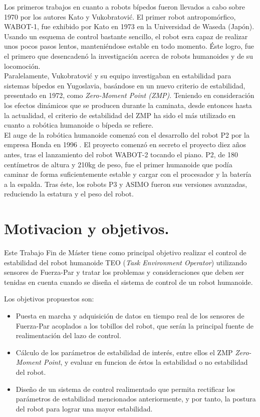 Los primeros trabajos en cuanto a robots bípedos fueron llevados a cabo sobre 1970 por los autores Kato \cite{Kaj} y Vukobratović. El primer robot antropomórfico, WABOT-1, fue exhibido por Kato en 1973 en la Universidad de Waseda (Japón). Usando un esquema de control bastante sencillo, el robot esra capaz de realizar unos pocos pasos lentos, manteniéndose estable en todo momento. Éste logro, fue el primero que desencadenó la investigación acerca de robots humanoides y de su locomoción.\\

Paralelamente, Vukobratović y su equipo investigaban en estabilidad para sistemas bípedos en Yugoslavia, basándose en un nuevo criterio de estabilidad, presentado en 1972, como \textit{Zero-Moment Point (ZMP)}. Teniendo en consideración los efectos dinámicos que se producen durante la caminata, desde entonces hasta la actualidad, el criterio de estabilidad del ZMP ha sido el más utilizado en cuanto a robótica humanoide o bípeda se refiere.\\

El auge de la robótica humanoide comenzó con el desarrollo del robot P2 por la empresa Honda en 1996 \cite{Kaj} . El proyecto comenzó en secreto el proyecto diez años antes, tras el lanzamiento del robot WABOT-2 tocando el piano. P2, de 180 centímetros de altura y 210kg de peso, fue el primer humanoide que podía caminar de forma suficientemente estable y cargar con el procesador y la batería a la espalda. Tras éste, los robots P3 y ASIMO fueron sus versiones avanzadas, reduciendo la estatura y el peso del robot.

\section{Motivacion y objetivos.}
Este Trabajo Fin de Máster tiene como principal objetivo realizar el control de estabilidad del robot humanoide TEO (\textit{Task Environment Operator}) utilizando sensores de Fuerza-Par y tratar los problemas y consideraciones que deben ser tenidas en cuenta cuando se diseña el sistema de control de un robot humanoide.

Los objetivos propuestos son:
\begin{itemize}
\item Puesta en marcha y adquisición de datos en tiempo real de los sensores de Fuerza-Par acoplados a los tobillos del robot, que serán la principal fuente de realimentación del lazo de control.
\item Cálculo de los parámetros de estabilidad de interés, entre ellos el ZMP \textit{Zero-Moment Point}, y evaluar en funcion de éstos la estabilidad o no estabilidad del robot.
\item Diseño de un sistema de control realimentado que permita rectificar los parámetros de estabilidad mencionados anteriormente, y por tanto, la postura del robot para lograr una mayor estabilidad. 
\end{itemize}



